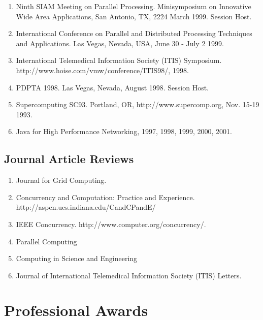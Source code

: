 \documentclass{article}
\begin{document}
\begin{enumerate}
\item  Ninth SIAM Meeting on Parallel Processing. Minisymposium on Innovative Wide Area Applications, San Antonio, TX, 2224 March 1999. Session Host. 
\item  International Conference on Parallel and Distributed Processing Techniques and Applications. Las Vegas, Nevada, USA, June 30 - July 2 1999. 
\item  International Telemedical Information Society (ITIS) Symposium. http://www.hoise.com/vmw/conference/ITIS98/, 1998. 
\item  PDPTA 1998. Las Vegas, Nevada, August 1998. Session Host. 
\item  Supercomputing SC93. Portland, OR, http://www.supercomp.org, Nov. 15-19 1993. 
\item  Java for High Performance Networking, 1997, 1998, 1999, 2000, 2001. 
\end{enumerate}
 
\subsection{Journal Article Reviews}

\begin{enumerate}
\item  Journal for Grid Computing. 
\item  Concurrency and Computation: Practice and Experience. http://aspen.ucs.indiana.edu/CandCPandE/ 
\item  IEEE Concurrency. http://www.computer.org/concurrency/. 
\item  Parallel Computing 
\item  Computing in Science and Engineering
\item  Journal of International Telemedical Information Society (ITIS) Letters. 
\end{enumerate}

\section{Professional Awards}   
\end{document}
